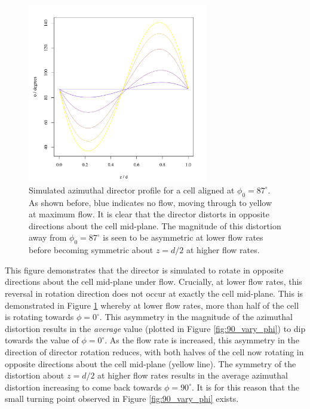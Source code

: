 \begin{figure}
\begin{center}
\includegraphics[width=0.7\textwidth]{Figures/90/uniform_twist_profile_sparce}
\end{center}
\caption[Simulated director twist profiles for the uniform state]{\label{fig:90_twist_profile_sparce}Simulated azimuthal director profile for a cell aligned at $\phi_0=87^{\circ}$. As shown before, blue indicates no flow, moving through to yellow at maximum flow. It is clear that the director distorts in opposite directions about the cell mid-plane. The magnitude of this distortion away from $\phi_0=87^{\circ}$ is seen to be asymmetric at lower flow rates before becoming symmetric about $z=d/2$ at higher flow rates.}
\end{figure}

This figure demonstrates that the director is simulated to rotate in opposite directions about the cell mid-plane under flow. Crucially, at lower flow rates, this reversal in rotation direction does not occur at exactly the cell mid-plane. This is demonstrated in Figure \ref{fig:90_twist_profile_sparce} whereby at lower flow rates, more than half of the cell is rotating towards $\phi=0^{\circ}$. This asymmetry in the magnitude of the azimuthal distortion results in the \textit{average} value (plotted in Figure \ref{fig:90_vary_phi}) to dip towards the value of $\phi=0^{\circ}$. As the flow rate is increased, this asymmetry in the direction of director rotation reduces, with both halves of the cell now rotating in opposite directions about the cell mid-plane (yellow line). The symmetry of the distortion about $z=d/2$ at higher flow rates results in the average azimuthal distortion increasing to come back towards $\phi=90^{\circ}$. It is for this reason that the small turning point observed in Figure \ref{fig:90_vary_phi} exists.

